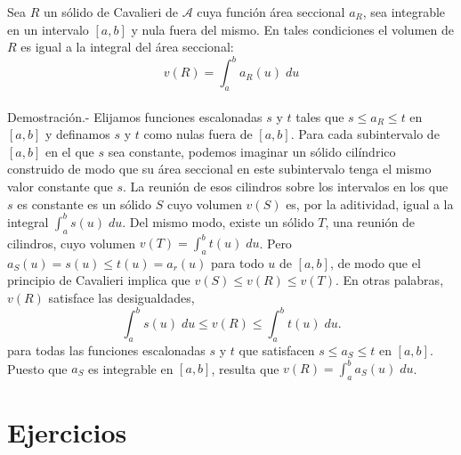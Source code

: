 \begin{teo}
    Sea $R$ un sólido de Cavalieri de $\mathscr{A}$ cuya función área seccional $a_R$, sea integrable en un intervalo $[a,b]$ y nula fuera del mismo. En tales condiciones el volumen de $R$ es igual a la integral del área seccional:
    $$v(R) = \int_a^b a_R(u)\; du$$\\
    Demostración.-\; Elijamos funciones escalonadas $s$ y $t$ tales que $s\leq a_R \leq t$ en $[a,b]$ y definamos $s$ y $t$ como nulas fuera de $[a,b]$. Para cada subintervalo de $[a,b]$ en el que $s$ sea constante, podemos imaginar un sólido cilíndrico construido de modo que su área seccional en este subintervalo tenga el mismo valor constante que $s$. La reunión de esos cilindros sobre los intervalos en los que $s$ es constante es un sólido $S$ cuyo volumen $v(S)$ es, por la aditividad, igual a la integral $\int_a^b s(u) \; du$. Del mismo modo, existe un sólido $T$, una reunión de cilindros, cuyo volumen $v(T)=\int_a^b t(u)\; du$. Pero $a_S(u) = s(u)\leq t(u)=a_r(u)$ para todo $u$ de $[a,b]$, de modo que el principio de Cavalieri implica que $v(S) \leq v(R)\leq v(T)$. En otras palabras, $v(R)$ satisface las desigualdades,
    $$\int_a^b s(u)\; du \leq v(R) \leq \int_a^b t(u)\; du.$$
    para todas las funciones escalonadas $s$ y $t$ que satisfacen $s\leq a_S \leq t$ en $[a,b]$. Puesto que $a_S$ es integrable en $[a,b]$, resulta que $v(R)=\int_a^b a_S(u)\; du$.
\end{teo}

\section{Ejercicios}


